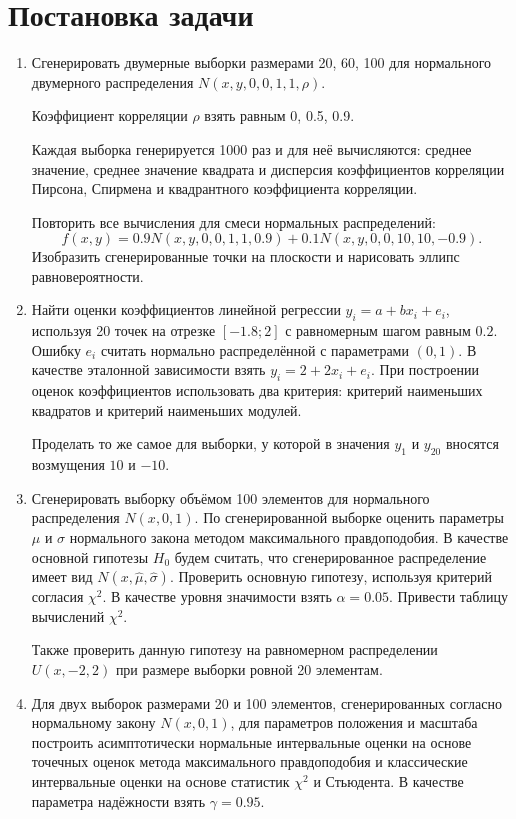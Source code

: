 \documentclass[12pt,a4paper]{article}
\begin{document}
\section{Постановка задачи}
	\begin{enumerate}
		\item Сгенерировать двумерные выборки размерами 20, 60, 100 для нормального двумерного распределения $N(x, y, 0, 0, 1, 1, \rho)$.
		
		Коэффициент корреляции $\rho$ взять равным 0, 0.5, 0.9.
		
		Каждая выборка генерируется 1000 раз и для неё вычисляются: среднее значение, среднее значение квадрата и дисперсия коэффициентов корреляции Пирсона, Спирмена и квадрантного коэффициента корреляции.
		
		Повторить все вычисления для смеси нормальных распределений:
		$$f(x, y) = 0.9N(x, y, 0, 0, 1, 1, 0.9) + 0.1N(x, y, 0, 0, 10, 10, -0.9).$$
		Изобразить сгенерированные точки на плоскости и нарисовать эллипс равновероятности.
		
		\item Найти оценки коэффициентов линейной регрессии $y_i = a + bx_i + e_i$, используя 20 точек на отрезке $[-1.8; 2]$ с равномерным шагом равным $0.2$. Ошибку $e_i$ считать нормально распределённой с параметрами $(0, 1)$. В качестве эталонной зависимости взять $y_i = 2 + 2x_i + e_i$. При построении оценок коэффициентов использовать два критерия: критерий наименьших квадратов и критерий наименьших модулей.
		
		Проделать то же самое для выборки, у которой в значения $y_1$ и $y_{20}$ вносятся возмущения $10$ и $-10$.
		
		\item Сгенерировать выборку объёмом 100 элементов для нормального распределения $N(x, 0, 1)$. По сгенерированной выборке оценить параметры $\mu$ и $\sigma$ нормального закона методом максимального правдоподобия. В качестве основной гипотезы $H_0$ будем считать, что сгенерированное распределение имеет вид $N(x, \hat{\mu}, \hat{\sigma})$. Проверить основную гипотезу, используя критерий согласия $\chi^2$. В качестве уровня значимости взять $\alpha = 0.05$. Привести таблицу вычислений $\chi^2$.
		
		Также проверить данную гипотезу на равномерном распределении $U(x, -2, 2)$ при размере выборки ровной 20 элементам.
		
		\item Для двух выборок размерами 20 и 100 элементов, сгенерированных согласно нормальному закону $N(x, 0, 1)$, для параметров положения и масштаба построить асимптотически нормальные интервальные оценки на основе точечных оценок метода максимального правдоподобия и классические интервальные оценки на основе статистик $\chi^2$ и Стьюдента. В качестве параметра надёжности взять $\gamma = 0.95$.
	\end{enumerate}
	
\end{document}
